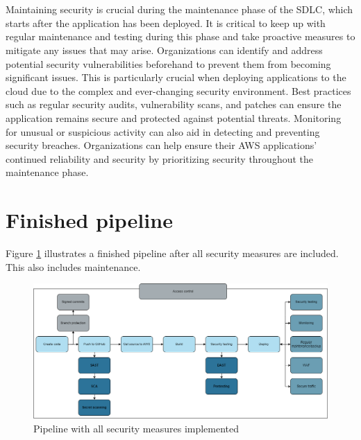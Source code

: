\\~\\
Maintaining security is crucial during the maintenance phase of the SDLC, which starts after the application has been deployed. It is critical to keep up with regular maintenance and testing during this phase and take proactive measures to mitigate any issues that may arise. Organizations can identify and address potential security vulnerabilities beforehand to prevent them from becoming significant issues. This is particularly crucial when deploying applications to the cloud due to the complex and ever-changing security environment. Best practices such as regular security audits, vulnerability scans, and patches can ensure the application remains secure and protected against potential threats. Monitoring for unusual or suspicious activity can also aid in detecting and preventing security breaches. Organizations can help ensure their AWS applications' continued reliability and security by prioritizing security throughout the maintenance phase.


\section{Finished pipeline}
Figure \ref{fig: Pipeline with all security measures implemented} illustrates a finished pipeline after all security measures are included. This also includes maintenance.  

\vspace{2mm}
\begin{figure}[H]
    \centering
    \includegraphics[width=0.8\columnwidth]{Images/FinalPipeline.png}
    \caption{Pipeline with all security measures implemented}
    \label{fig: Pipeline with all security measures implemented}
\end{figure}



